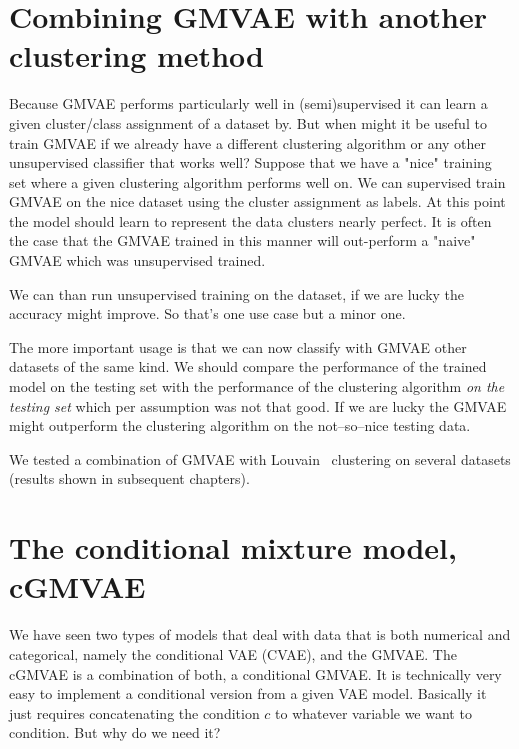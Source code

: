 \documentclass[11pt, a4paper]{report}
\theoremstyle{plain}
\theoremstyle{definition}
\theoremstyle{remark}
\begin{document}
\section{Combining GMVAE with another clustering method}

Because GMVAE performs particularly well in (semi)supervised 
it can learn a given cluster/class assignment of a dataset by.
But when might it be useful to train GMVAE if we already have a different
clustering algorithm or any other unsupervised classifier that works well?
Suppose that we have a "nice" training set where a given clustering algorithm
performs well on.
We can supervised train GMVAE on the nice dataset using the cluster assignment
as labels. At this point the model should learn to represent the data clusters
nearly perfect.
It is often the case that the GMVAE trained in this manner will out-perform 
a "naive" GMVAE which was unsupervised trained.

We can than run unsupervised training on the dataset, if we are
lucky the accuracy might improve. So that's one use case but a minor one.

The more important usage is that we can now classify with GMVAE other datasets
of the same kind.
We should compare the performance of the trained model on the testing set with
the performance of the clustering algorithm \emph{on the testing set} which per
assumption was not that good. If we are lucky the GMVAE might outperform the
clustering algorithm on the not--so--nice testing data.

We tested a combination of GMVAE with Louvain~\cite{que2015scalable} clustering
on several datasets (results shown in subsequent chapters).


\section{The conditional mixture model, cGMVAE}

We have seen two types of models that deal with data that is both numerical and
categorical, namely the conditional VAE (CVAE), and the GMVAE.
The cGMVAE is a combination of both, a conditional GMVAE. 
It is technically very easy to implement a conditional version from a 
given VAE model. Basically it just requires 
concatenating the condition $c$ to whatever variable we want to condition.
But why do we need it?
\end{document}
